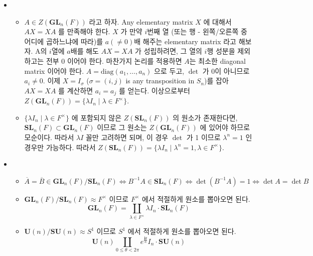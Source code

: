 \documentclass[12pt]{report}
\newcommand{\numl}[1]{\item[\large\textbf{\sffamily #1}]}
\newcommand{\num}[1]{\item[\textbf{\sffamily #1}]}
\newcommand{\rmbf}[1]{\mathrm{\mathbf{#1}}}
\begin{document}
\begin{itemize}
\numl{12.2.20}
	\begin{itemize}
		\num{(가)} $A\in Z(\rmbf{GL}_n(F))$ 라고 하자. Any elementary matrix $X$ 에 대해서 $AX=XA$ 를 만족해야 한다. $X$ 가 만약 $i$번째 열 (또는 행 - 왼쪽/오른쪽 중 어디에 곱하느냐에 따라)를 $a (\neq 0)$배 해주는 elementary matrix 라고 해보자. A의 $i$열에 $a$배를 해도 $AX=XA$ 가 성립하려면, 그 열의 $i$행 성분을 제외하고는 전부 $0$ 이어야 한다. 마찬가지 논리를 적용하면 $A$는 최소한 diagonal matrix 이어야 한다. $A=\text{diag}(a_{1}, \dots, a_{n})$ 으로 두고, $\det$ 가 0이 아니므로 $a_i\neq 0$. 이제 $X=I_\sigma$ ($\sigma = (i, j)$ is any transposition in $S_n$)를 잡아 $AX=XA$ 를 계산하면 $a_i = a_j$ 를 얻는다. 이상으로부터 $Z(\rmbf{GL}_n(F)) = \{\lambda I_n\; | \; \lambda \in F^{\times}\}$.
		\num{(나)} $\{\lambda I_n \; | \; \lambda \in F^{\times}\}$ 에 포함되지 않은 $Z(\rmbf{SL}_n(F))$ 의 원소가 존재한다면, $\rmbf{SL}_n(F) \subset \rmbf{GL}_n(F)$ 이므로 그 원소는 $Z(\rmbf{GL}_n(F))$ 에 있어야 하므로 모순이다. 따라서 $\lambda I$ 꼴만 고려하면 되며, 이 경우 $\det$ 가 1 이므로 $\lambda^n=1$ 인 경우만 가능하다. 따라서 $Z(\rmbf{SL}_n(F)) = \{\lambda I_n \; | \; \lambda^n=1, \lambda \in F^{\times}\}$.
	\end{itemize}

\numl{12.4.7} 
	\begin{itemize}
		\num{(가)} $\overline{A} = \overline{B} \in \rmbf{GL}_n(F)/\rmbf{SL}_n(F) \Leftrightarrow B^{-1}A\in \rmbf{SL}_n(F) \Leftrightarrow \det(B^{-1}A) = 1 \Leftrightarrow \det A = \det B$
		\num{(나)} $\rmbf{GL}_n(F) / \rmbf{SL}_n(F) \approx F^{\times}$ 이므로 $F^{\times}$ 에서 적절하게 원소를 뽑아오면 된다. $$\rmbf{GL}_n(F) = \coprod_{\lambda \in F^{\times}} \lambda I_n \cdot \rmbf{SL}_n(F)$$ 
		\num{(다)} $\rmbf{U}(n)/\rmbf{SU}(n) \approx S^1$ 이므로 $S^1$ 에서 적절하게 원소를 뽑아오면 된다.
		$$\rmbf{U}(n) \coprod_{0\leq \theta < 2\pi} e^{\frac{\rmbf{i}\theta}{n}} I_n\cdot \rmbf{SU}(n)$$
	\end{itemize}


\end{itemize}
\end{document}

